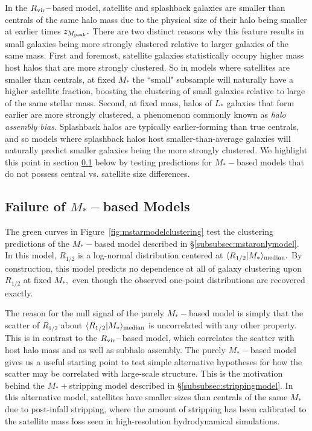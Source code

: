 \documentclass[usenatbib,usegraphicx,letterpaper]{mn2e}
\newcommand{\rhalf}{R_{1/2}}
\newcommand{\mstar}{M_{\ast}}
\newcommand{\zpeak}{z_{M_{\rm peak}}}
\newcommand{\rvir}{R_{\rm vir}}
\newcommand{\median}[2]{\langle{#1}\vert{#2}\rangle_{\rm median}}
\begin{document}
In the $\rvir-$based model, satellite and splashback galaxies are smaller than centrals of the same halo mass due to the physical size of their halo being smaller at earlier times $\zpeak.$ There are two distinct reasons why this feature results in small galaxies being more strongly clustered relative to larger galaxies of the same mass. First and foremost, satellite galaxies statistically occupy higher mass host halos that are more strongly clustered. So in models where satellites are smaller than centrals, at fixed $\mstar$ the ``small" subsample will naturally have a higher satellite fraction, boosting the clustering of small galaxies relative to large of the same stellar mass. Second, at fixed mass, halos of $L_\ast$ galaxies that form earlier are more strongly clustered, a phenomenon commonly known as {\em halo assembly bias}. Splashback halos are typically earlier-forming than true centrals, and so models where splashback halos host smaller-than-average galaxies will naturally predict smaller galaxies being the more strongly clustered. We highlight this point in section \ref{subsec:orphan_stripping} below by testing predictions for $\mstar-$based models that do not possess central vs. satellite size differences. 

\subsection{Failure of $\mstar-$based Models}
\label{subsec:orphan_stripping}

The green curves in Figure~\ref{fig:mstarmodelclustering} test the clustering predictions of the $\mstar-$based model described in \S\ref{subsubsec:mstaronlymodel}. In this model, $\rhalf$ is a log-normal distribution centered at $\median{\rhalf}{\mstar}.$ By construction, this model predicts no dependence at all of galaxy clustering upon $\rhalf$ at fixed $\mstar,$ even though the observed one-point distributions are recovered exactly. 

The reason for the null signal of the purely $\mstar-$based model is simply that the scatter of $\rhalf$ about $\median{\rhalf}{\mstar}$ is uncorrelated with any other property. This is in contrast to the $\rvir-$based model, which correlates the scatter with host halo mass and as well as subhalo assembly. The purely $\mstar-$based model gives us a useful starting point to test simple alternative hypotheses for how the scatter may be correlated with large-scale structure. This is the motivation behind the $\mstar+$stripping model described in \S\ref{subsubsec:strippingmodel}. In this alternative model, satellites have smaller sizes than centrals of the same $\mstar$ due to post-infall stripping, where the amount of stripping has been calibrated to the satellite mass loss seen in high-resolution hydrodynamical simulations. 
\end{document}
